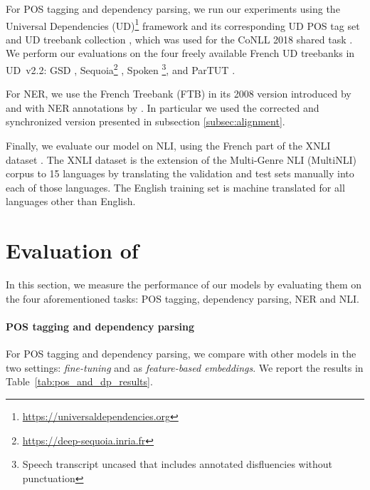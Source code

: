 For POS tagging and dependency parsing, we run our experiments using the Universal Dependencies (UD)\footnote{\url{https://universaldependencies.org}} framework and its corresponding UD POS tag set \citep{petrov-etal-2012-universal} and UD treebank collection \citep{nivre-etal-2018-universal}, which was used for the CoNLL 2018 shared task \citep{seker-etal-2018-universal}. We perform our evaluations on the four freely available French UD treebanks in UD~v2.2: GSD \citep{mcdonald-etal-2013-universal}, Sequoia\footnote{\url{https://deep-sequoia.inria.fr}} \citep{candito-seddah-2012-le,candito-etal-2014-deep}, Spoken \citep{lacheret-etal-2014-rhapsodie,bawden-etal-2014-correcting}\footnote{Speech transcript uncased that includes annotated disfluencies without punctuation}, and ParTUT \cite{sanguinetti-Bosco-2015-parttut}.

For NER, we use the French Treebank (FTB) \citep{abeille-etal-2003-building} in its 2008 version introduced by \citet{candito-crabbe-2009-improving} and with NER annotations by \citet{sagot-etal-2012-annotation}. In particular we used the corrected and synchronized version \citep{ortiz-suarez-etal-2020-establishing} presented in subsection \ref{subsec:alignment}.

Finally, we evaluate our model on NLI, using the French part of the XNLI dataset \cite{conneau-etal-2018-xnli}. The XNLI dataset is the extension of the Multi-Genre NLI (MultiNLI) corpus \cite{williams-etal-2018-broad} to 15 languages by translating the validation and test sets manually into each of those languages. The English training set is machine translated for all languages other than English.

\section{Evaluation of \camembert}

In this section, we measure the performance of our models by evaluating them on the four aforementioned tasks: POS tagging, dependency parsing, NER and NLI.

\paragraph{POS tagging and dependency parsing}
For POS tagging and dependency parsing, we compare \camembert with other models in the two settings: \textit{fine-tuning} and as \textit{feature-based embeddings}. We report the results in Table~\ref{tab:pos_and_dp_results}.

